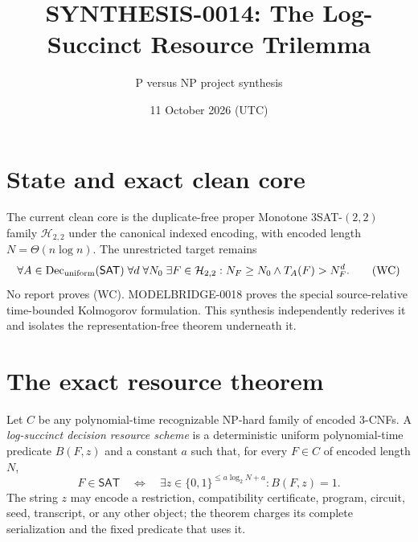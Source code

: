 \documentclass[11pt]{article}
\title{SYNTHESIS-0014: The Log-Succinct Resource Trilemma}
\author{P versus NP project synthesis}
\date{11 October 2026 (UTC)}
\newcommand{\SAT}{\mathsf{SAT}}
\begin{document}
\maketitle

\begin{center}
\end{center}

\section{State and exact clean core}

The current clean core is the duplicate-free proper Monotone $3$SAT-$(2,2)$ family $\mathcal H_{2,2}$ under the canonical indexed encoding, with encoded length $N=\Theta(n\log n)$.  The unrestricted target remains
\[
\forall A\in\operatorname{Dec}_{\rm uniform}(\SAT)\;\forall d\;\forall N_0\;\exists F\in\mathcal H_{2,2}:
N_F\ge N_0\land T_A(F)>N_F^d.
\tag{WC}
\]
No report proves (WC).  MODELBRIDGE-0018 proves the special source-relative time-bounded Kolmogorov formulation.  This synthesis independently rederives it and isolates the representation-free theorem underneath it.

\section{The exact resource theorem}

Let $C$ be any polynomial-time recognizable NP-hard family of encoded $3$-CNFs.  A \emph{log-succinct decision resource scheme} is a deterministic uniform polynomial-time predicate $B(F,z)$ and a constant $a$ such that, for every $F\in C$ of encoded length $N$,
\[
F\in\SAT\quad\Longleftrightarrow\quad
\exists z\in\{0,1\}^{\le a\log_2N+a}:B(F,z)=1.
\tag{R}
\]
The string $z$ may encode a restriction, compatibility certificate, program, circuit, seed, transcript, or any other object; the theorem charges its complete serialization and the fixed predicate that uses it.
\end{document}
